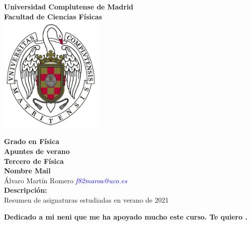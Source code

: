 \documentclass[10pt,a4paper]{report}
\begin{document}
\begin{titlepage}
    \begin{center}
        \textbf{\LARGE Universidad Complutense de Madrid}\\[0.5cm] 
        \textbf{\large Facultad de Ciencias Físicas}\\[0.2cm]
        \vspace{20pt}\includegraphics[width=5cm]{img/ucm.png}\\
        \par
        \vspace{20pt}
          \textbf{\Large Grado en Física}\\
          \vspace{15pt}
          \myrule[1pt][7pt]
          \textbf{\LARGE  Apuntes de verano}\\
          \vspace{15pt}
          \textbf{\large Tercero de Física}\\
          \myrule[1pt][7pt]
          \vspace{35pt}
          \textbf{\large Nombre \hspace{100pt} Mail}\\
          \vspace{15pt}
          Álvaro Martín Romero \hspace{50pt} \textcolor{blue}{\textit{f82maroa@uco.es}} \\ 


          \vspace{70pt}  
          \textbf {\large Descripción:}\\[0.2cm]
          \Large {Resumen de asignaturas estudiadas en verano de 2021}\\[0.1cm]
      \end{center}

      \par
      \vfill
      \begin{center}
          \textbf{Dedicado a mi neni que me ha apoyado mucho este curso. Te quiero .}\\
      \end{center}

  \end{titlepage}
  \thispagestyle{fancy}
\end{document}
